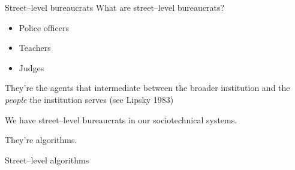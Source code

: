 \documentclass[presentation]{subfiles}
\begin{document}
\begin{frame}{Street--level bureaucrats}
What are street--level bureaucrats?
\begin{itemize}
  \item Police officers
  \item Teachers
  \item Judges
\end{itemize}
They're the agents that intermediate between the broader institution and the \textit{people} the institution serves (see Lipsky 1983)
\end{frame}


\begin{frame}[standout]
    We have \alert{street--level bureaucrats} in our sociotechnical systems.

    They're algorithms.

    \alert{Street--level algorithms}
\end{frame}






\end{document}
